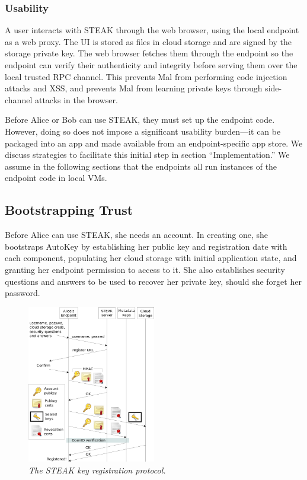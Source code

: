 \subsubsection{Usability}
A user interacts with STEAK through the web browser, using the local endpoint as a web proxy.  The UI is stored as files in cloud storage and are signed by the storage private key.  The web browser fetches them through the endpoint so the endpoint can verify their authenticity and integrity before serving them over the local trusted RPC channel.  This prevents Mal from performing code injection attacks and XSS, and prevents Mal from learning private keys through side-channel attacks in the browser.

Before Alice or Bob can use STEAK, they must set up the endpoint code.  However, doing so does not impose a significant usability burden---it can be packaged into an app and made available from an endpoint-specific app store.  We discuss strategies to facilitate this initial step in section “Implementation.”  We assume in the following sections that the endpoints all run instances of the endpoint code in local VMs.

\subsection{Bootstrapping Trust}
Before Alice can use STEAK, she needs an account.  In creating one, she bootstraps AutoKey by establishing her public key and registration date with each component, populating her cloud storage with initial application state, and granting her endpoint permission to access to it.  She also establishes security questions and answers to be used to recover her private key, should she forget her password.

\begin{figure}[h!]
\centering
\includegraphics[width=0.5\textwidth]{figures/register}
\caption{\it The STEAK key registration protocol.}
\label{fig:register}
\end{figure}

